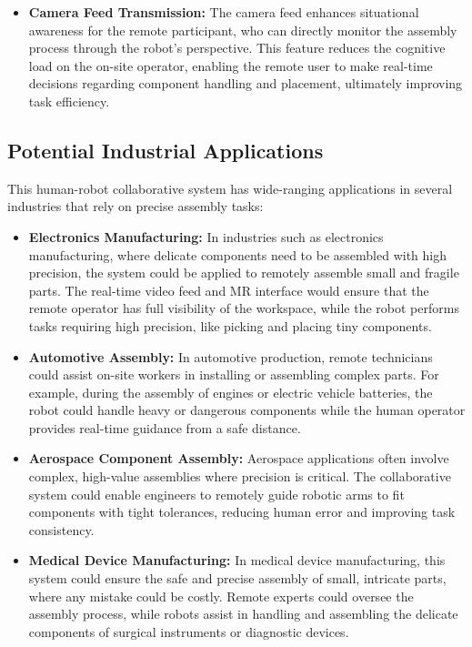 \begin{itemize}
        \item \textbf{Camera Feed Transmission:} The camera feed enhances situational awareness for the remote participant, who can directly monitor the assembly process through the robot’s perspective. This feature reduces the cognitive load on the on-site operator, enabling the remote user to make real-time decisions regarding component handling and placement, ultimately improving task efficiency.
    
    \end{itemize}
    
    \subsection{Potential Industrial Applications}
    
    This human-robot collaborative system has wide-ranging applications in several industries that rely on precise assembly tasks:
    
    \begin{itemize}
        \item \textbf{Electronics Manufacturing:} In industries such as electronics manufacturing, where delicate components need to be assembled with high precision, the system could be applied to remotely assemble small and fragile parts. The real-time video feed and \ac{MR} interface would ensure that the remote operator has full visibility of the workspace, while the robot performs tasks requiring high precision, like picking and placing tiny components.
    
        \item \textbf{Automotive Assembly:} In automotive production, remote technicians could assist on-site workers in installing or assembling complex parts. For example, during the assembly of engines or electric vehicle batteries, the robot could handle heavy or dangerous components while the human operator provides real-time guidance from a safe distance.
    
        \item \textbf{Aerospace Component Assembly:} Aerospace applications often involve complex, high-value assemblies where precision is critical. The collaborative system could enable engineers to remotely guide robotic arms to fit components with tight tolerances, reducing human error and improving task consistency.
    
        \item \textbf{Medical Device Manufacturing:} In medical device manufacturing, this system could ensure the safe and precise assembly of small, intricate parts, where any mistake could be costly. Remote experts could oversee the assembly process, while robots assist in handling and assembling the delicate components of surgical instruments or diagnostic devices.
    
    \end{itemize}
    
